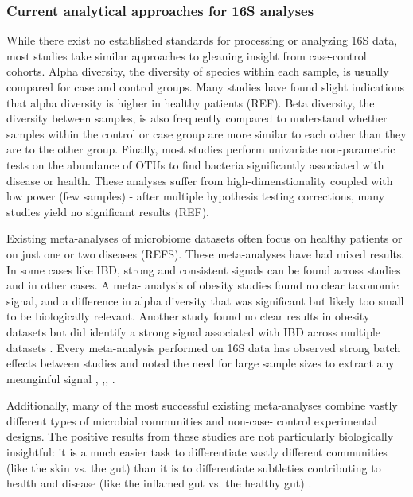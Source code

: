 \documentclass[12pt]{article}
\begin{document}
\subsubsection{Current analytical approaches for 16S analyses}
While there exist no established standards for processing or analyzing 
16S data, most studies take similar approaches to gleaning insight 
from case-control cohorts. Alpha diversity, the diversity of species 
within each sample, is usually compared for case and control groups. 
Many studies have found slight indications that alpha diversity is 
higher in healthy patients (REF). Beta diversity, the diversity 
between samples, is also frequently compared to understand whether 
samples within the control or case group are more similar to each 
other than they are to the other group. Finally, most studies perform 
univariate non-parametric tests on the abundance of OTUs to find 
bacteria significantly associated with disease or health. These 
analyses suffer from high-dimenstionality coupled with low power (few 
samples) - after multiple hypothesis testing corrections, many studies 
yield no significant results (REF).

Existing meta-analyses of microbiome datasets often focus on healthy 
patients or on just one or two diseases (REFS). These meta-analyses 
have had mixed results. In some cases like IBD, strong and consistent 
signals can be found across studies and in other cases. A meta-
analysis of obesity studies found no clear taxonomic signal, and a 
difference in alpha diversity that was significant but likely too 
small to be biologically relevant\cite{sze-signal-2016}. Another study 
found no clear results in obesity datasets but did identify a strong 
signal associated with IBD across multiple datasets \cite{walters-
ob_meta-2014}. Every meta-analysis performed on 16S data has observed 
strong batch effects between studies and noted the need for large 
sample sizes to extract any meanginful signal \cite{sze-signal-2016},
\cite{walters-ob_meta-2014},\cite{knights-supervised-2010},
\cite{lozupone-meta-2013}. 

Additionally, many of the most successful existing meta-analyses 
combine vastly different types of microbial communities and non-case-
control experimental designs. The positive results from these studies 
are not particularly biologically insightful: it is a much easier task 
to differentiate vastly different communities (like the skin vs. the 
gut) than it is to differentiate subtleties contributing to health and 
disease (like the inflamed gut vs. the healthy gut) \cite{knights-
supervised-2010}.
\end{document}
